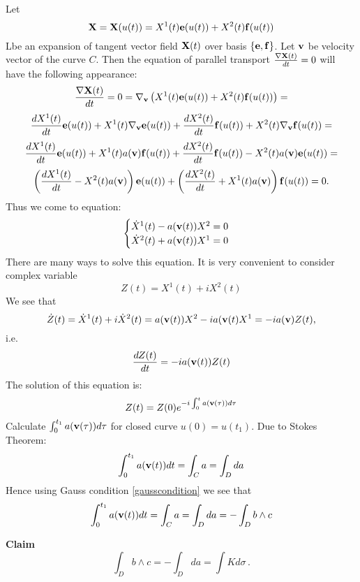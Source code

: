 \documentclass[12pt]{article}
\theoremstyle{theorem}
\numberwithin{equation}{section}
\begin{document}
{Let        $$
{\bf X}={\bf X}(u(t))=X^1(t){\bf e}(u(t))+X^2(t){\bf f}(u(t))
           $$
Lbe an expansion of tangent vector field ${\bf X}(t)$ over basis $\{{\bf e},{\bf f}\}$.
Let ${\bf v}$ be velocity vector of the curve $C$.
  Then the equation of parallel transport ${\nabla {\bf X}(t)\over dt}=0$
                 will have the following appearance:
                      $$
              {\nabla {\bf X}(t)\over dt}=0=\nabla_{\bf v} \left(X^1(t){\bf e}(u(t))+X^2(t){\bf f}(u(t))\right)=
                      $$
                      $$
                      {dX^1(t)\over dt}{\bf e}(u(t))+X^1(t)\nabla_{\bf v}{\bf e}(u(t))+
                      {dX^2(t)\over dt}{\bf f}(u(t))+X^2(t)\nabla_{\bf v}{\bf f}(u(t))=
                      $$
                      $$
                      {dX^1(t)\over dt}{\bf e}(u(t))+X^1(t)a({\bf v}){\bf f}(u(t))+
                      {dX^2(t)\over dt}{\bf f}(u(t))-X^2(t)a({\bf v}){\bf e}(u(t))=
                      $$
              $$
          \left({dX^1(t)\over dt}-X^2(t)a({\bf v})\right){\bf e}(u(t))+
           \left({dX^2(t)\over dt}+X^1(t)a({\bf v})\right){\bf f}(u(t))=0.
              $$
Thus we come to equation:
              $$
             \begin{cases}
             \dot X^1(t)-a({\bf v}(t))X^2=0\cr
             \dot X^2(t)+a({\bf v}(t))X^1=0\cr
             \end{cases}
              $$
There are many ways to solve this equation. It is very convenient to consider complex variable
             $$
           Z(t)=X^1(t)+iX^2(t)
             $$
We see that
             $$
         \dot Z(t)=\dot X^1(t)+i\dot X^2(t)=a({\bf v}(t))X^2-ia({\bf v}(t)X^1=-ia({\bf v})Z(t),
                 $$
i.e.
   \begin{equation}\label{complexrotation}
    {dZ(t)\over dt}=-ia({\bf v}(t))Z(t)
   \end{equation}
The solution of this equation is:
           \begin{equation}\label{complexrotation}
      Z(t)=Z(0)e^{-i\int_0^t a({\bf v}(\tau))d\tau}
   \end{equation}
   Calculate $\int_0^{t_1} a({\bf v}(\tau))d\tau$ for closed curve $u(0)=u(t_1)$. Due to Stokes Theorem:
            $$
            \int_0^{t_1} a({\bf v}(t))dt=\int_C a=\int_D da
            $$
   Hence using Gauss condition \eqref{gausscondition} we see that
      $$
      \int_0^{t_1} a({\bf v}(t))dt=\int_C a=\int_D da=-\int_D b\wedge c
      $$

{\bf Claim}
            \begin{equation}\label{claimoncurvature}
            \int_D b\wedge c=-\int_D da=\int K d\sigma\,.
            \end{equation}

}
\end{document}
